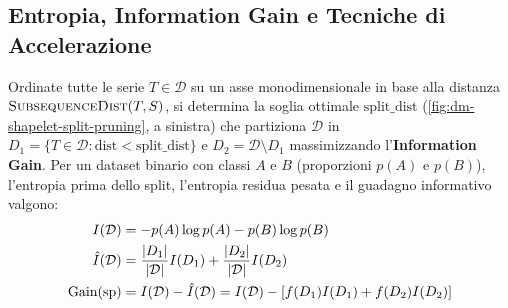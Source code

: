 \FloatBarrier
\subsection{Entropia, Information Gain e Tecniche di Accelerazione}
\label{subsec:dm-shapelets-ig-speedup}

Ordinate tutte le serie $T \in \mathcal{D}$ su un asse monodimensionale in base alla distanza $\textsc{SubsequenceDist}(T, S)$, si determina la soglia ottimale $\text{split\_dist}$ (\autoref{fig:dm-shapelet-split-pruning}, a sinistra) che partiziona $\mathcal{D}$ in $D_1 = \{T \in \mathcal{D} : \text{dist} < \text{split\_dist}\}$ e $D_2 = \mathcal{D} \setminus D_1$ massimizzando l'\textbf{Information Gain}. Per un dataset binario con classi $A$ e $B$ (proporzioni $p(A)$ e $p(B)$), l'entropia prima dello split, l'entropia residua pesata e il guadagno informativo valgono:
\begin{align}
    I(\mathcal{D}) &= -p(A)\log p(A) - p(B)\log p(B) \\
    \hat{I}(\mathcal{D}) &= \frac{\left|D_1\right|}{\left|\mathcal{D}\right|} I(D_1) + \frac{\left|D_2\right|}{\left|\mathcal{D}\right|} I(D_2) \\
    \text{Gain}(\text{sp}) &= I(\mathcal{D}) - \hat{I}(\mathcal{D}) = I(\mathcal{D}) - \left[ f(D_1) I(D_1) + f(D_2) I(D_2) \right]
\end{align}

